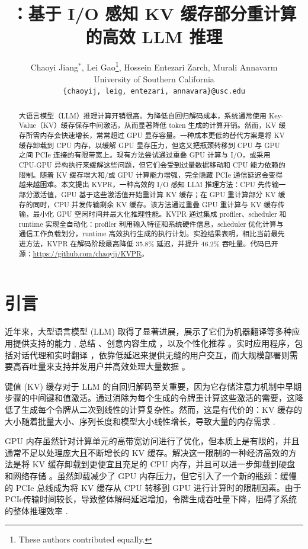 \documentclass[11pt]{article}
\title{\paperName：基于 I/O 感知 KV 缓存部分重计算的高效 LLM 推理}
\author{%
  Chaoyi Jiang$^{*}$, Lei Gao\thanks{These authors contributed equally.}, Hossein Entezari Zarch, Murali Annavarm\\
  University of Southern California\\
  \texttt{\{chaoyij, leig, entezari, annavara\}@usc.edu}\\
}
\begin{document}
\maketitle

\begin{abstract}
大语言模型（LLM）推理计算开销很高。为降低自回归解码成本，系统通常使用 Key-Value（KV）缓存保存中间激活，从而显著降低 token 生成的计算开销。然而，KV 缓存所需内存会快速增长，常常超过 GPU 显存容量。一种成本更低的替代方案是将 KV 缓存卸载到 CPU 内存，以缓解 GPU 显存压力，但这又把瓶颈转移到 CPU 与 GPU 之间 PCIe 连接的有限带宽上。现有方法尝试通过重叠 GPU 计算与 I/O，或采用 CPU-GPU 异构执行来缓解这些问题，但它们会受到过量数据移动和 CPU 能力依赖的限制。随着 KV 缓存增大和/或 GPU 计算能力增强，完全隐藏 PCIe 通信延迟会变得越来越困难。本文提出 KVPR，一种高效的 I/O 感知 LLM 推理方法：CPU 先传输一部分激活值，GPU 基于这些激活值开始重计算 KV 缓存；在 GPU 重计算部分 KV 缓存的同时，CPU 并发传输剩余 KV 缓存。该方法通过重叠 GPU 重计算与 KV 缓存传输，最小化 GPU 空闲时间并最大化推理性能。KVPR 通过集成 profiler、scheduler 和 runtime 实现全自动化：profiler 利用输入特征和系统硬件信息，scheduler 优化计算与通信工作负载划分，runtime 高效执行生成的执行计划。实验结果表明，相比当前最先进方法，KVPR 在解码阶段最高降低 35.8\% 延迟，并提升 46.2\% 吞吐量。代码已开源：\url{https://github.com/chaoyij/KVPR}。
\end{abstract}


\section{引言}
近年来，大型语言模型 (LLM) 取得了显著进展，展示了它们为机器翻译等多种应用提供支持的能力 \cite{zhu2024multilingual}, 总结 \cite{openai2024gpt4}、创意内容生成 \cite{geminiteam2024gemini}，以及个性化推荐 \cite{geng2022p5}。实时应用程序，包括对话代理和实时翻译 \cite{li2023camel}，依靠低延迟来提供无缝的用户交互，而大规模部署则需要高吞吐量来支持并发用户并高效处理大量数据 \cite{kwon2023vllm}。

键值 (KV) 缓存对于 LLM 的自回归解码至关重要，因为它存储注意力机制中早期步骤的中间键和值激活。通过消除为每个生成的令牌重计算这些激活的需要，这降低了生成每个令牌从二次到线性的计算复杂性。然而，这是有代价的：KV 缓存的大小随着批量大小、序列长度和模型大小线性增长，导致大量的内存需求 \cite{wan2024efficient}.

GPU 内存虽然针对计算单元的高带宽访问进行了优化，但本质上是有限的，并且通常不足以处理庞大且不断增长的 KV 缓存。解决这一限制的一种经济高效的方法是将 KV 缓存卸载到更便宜且充足的 CPU 内存，并且可以进一步卸载到硬盘和网络存储 \cite{liu2024cachegen}。虽然卸载减少了 GPU 内存压力，但它引入了一个新的瓶颈：缓慢的 PCIe 总线成为将 KV 缓存从 CPU 转移到 GPU 进行计算时的限制因素。由于PCIe传输时间较长，导致整体解码延迟增加，令牌生成吞吐量下降，阻碍了系统的整体推理效率 \cite{zhao2024hetegen}.
\end{document}

